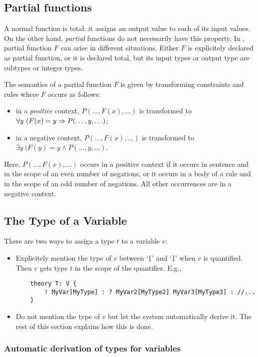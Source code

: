 \documentclass[a4]{article}
\begin{document}
\subsection{Partial functions}\label{ssec:partial}
A normal function is total: it assigns an output value to each of its input values. On the other hand, \emph{partial} functions do not necessarily have this property. In \idp, partial function $F$ can arise in different situations. Either $F$ is explicitely declared as partial function, or it is declared total, but its input types or output type are subtypes or integer types.

The semantics of a partial function $F$ is given by transforming constraints and rules where $F$ occurs as follows:
\begin{itemize}
	\item in a \emph{positive} context, $P(\ldots,F(x),\ldots)$ is transformed to $\forall y\ (F(x) = y \Rightarrow P(\ldots,y,\ldots)$;
	\item in a negative context, $P(\ldots,F(x),\ldots)$ is transformed to $\exists y\ (F(y) = y \land P(\ldots,y,\ldots)$.
\end{itemize}
Here, $P(\ldots,F(x),\ldots)$ occurs in a positive context if it occurs in sentence and in the scope of an even number of negations, or it occurs in a body of a rule and in the scope of an odd number of negations. All other occurrences are in a negative context. 

                                                              
\subsection{The Type of a Variable}\label{ssec:vtype}
There are two ways to assign a type $t$ to a variable $v$:
\begin{itemize}
	\item Explicitely mention the type of $v$ between `{\tt [}' and `{\tt ]}' when $v$ is quantified. Then $v$ gets type $t$ in the scope of the quantifier. E.g.,
	\begin{lstlisting}
	theory T: V {
		! MyVar[MyType] : ? MyVar2[MyType2] MyVar3[MyType3] : //...
	}
	\end{lstlisting}
	\item Do not mention the type of $v$ but let the system automatically derive it. The rest of this section explains how this is done.
\end{itemize}

\subsubsection{Automatic derivation of types for variables}
\end{document}
